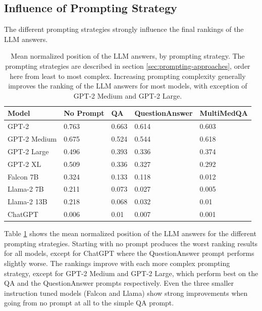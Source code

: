 \subsection{Influence of Prompting Strategy}
The different prompting strategies strongly influence the final rankings of the LLM answers.
\begin{table}[tb]
\centering
\begin{tabular}{lllll}
\hline
\textbf{Model}        & \textbf{No Prompt} & \textbf{QA}     & \textbf{QuestionAnswer} & \textbf{MultiMedQA} \\\hline
GPT-2        & 0.763      & 0.663 & 0.614    & 0.603      \\
GPT-2 Medium & 0.675      & 0.524 & 0.544    & 0.618      \\
GPT-2 Large  & 0.496      & 0.393 & 0.336    & 0.374      \\
GPT-2 XL     & 0.509      & 0.336 & 0.327    & 0.292      \\
Falcon 7B    & 0.324      & 0.133 & 0.118    & 0.012      \\
Llama-2 7B   & 0.211      & 0.073 & 0.027    & 0.005      \\
Llama-2 13B  & 0.218      & 0.068 & 0.032    & 0.01       \\
ChatGPT      & 0.006      & 0.01  & 0.007    & 0.001     \\
\hline
\end{tabular}
\caption{Mean normalized position of the LLM answers, by prompting strategy.
The prompting strategies are described in section \ref{sec:prompting-approaches}, order here from least to most complex.
Increasing prompting complexity generally improves the ranking of the LLM answers for most models, with exception of GPT-2 Medium and GPT-2 Large.
}
\label{tab:prompting_strategy}
\end{table}
Table \ref{tab:prompting_strategy} shows the mean normalized position of the LLM answers for the different prompting strategies.
Starting with no prompt produces the worst ranking results for all models, except for ChatGPT where the QuestionAnswer prompt performs slightly worse.
The rankings improve with each more complex prompting strategy, except for GPT-2 Medium and GPT-2 Large, which perform best on the QA and the QuestionAnswer prompts respectively.
Even the three smaller instruction tuned models (Falcon and Llama) show strong improvements when going from no prompt at all to the simple QA prompt.

